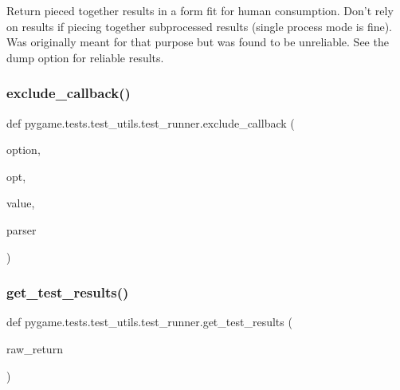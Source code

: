 \begin{DoxyVerb}Return pieced together results in a form fit for human consumption. Don't
rely on results if  piecing together subprocessed  results (single process
mode is fine). Was originally meant for that  purpose but was found to be
unreliable.  See the dump option for reliable results.\end{DoxyVerb}
 \mbox{\label{namespacepygame_1_1tests_1_1test__utils_1_1test__runner_a8c554f36538099d997613efb39719e85}} 
\subsubsection{\texorpdfstring{exclude\+\_\+callback()}{exclude\_callback()}}
{\footnotesize\ttfamily def pygame.\+tests.\+test\+\_\+utils.\+test\+\_\+runner.\+exclude\+\_\+callback (\begin{DoxyParamCaption}\item[{}]{option,  }\item[{}]{opt,  }\item[{}]{value,  }\item[{}]{parser }\end{DoxyParamCaption})}

\mbox{\label{namespacepygame_1_1tests_1_1test__utils_1_1test__runner_a331b1fbb8ee9c161c08e0b455d122281}} 
\subsubsection{\texorpdfstring{get\+\_\+test\+\_\+results()}{get\_test\_results()}}
{\footnotesize\ttfamily def pygame.\+tests.\+test\+\_\+utils.\+test\+\_\+runner.\+get\+\_\+test\+\_\+results (\begin{DoxyParamCaption}\item[{}]{raw\+\_\+return }\end{DoxyParamCaption})}

